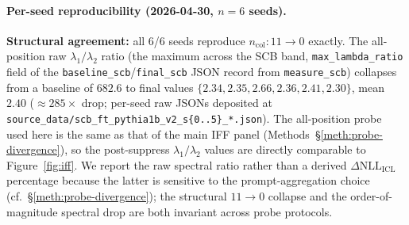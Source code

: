 \documentclass[11pt,a4paper]{article}
\begin{document}
\paragraph{Per-seed reproducibility (2026-04-30, $n=6$ seeds).}
\textbf{Structural agreement:} all 6/6 seeds reproduce
$n_\mathrm{col} : 11 \to 0$ exactly. The all-position raw
$\lambda_1/\lambda_2$ ratio (the maximum across the SCB band,
\texttt{max\_lambda\_ratio} field of the
\texttt{baseline\_scb}/\texttt{final\_scb} JSON record from
\texttt{measure\_scb}) collapses from a baseline of $682.6$ to
final values $\{2.34, 2.35, 2.66, 2.36, 2.41, 2.30\}$, mean $2.40$
($\approx 285\!\times\!$ drop; per-seed raw JSONs deposited at
\texttt{source\_data/scb\_ft\_pythia1b\_v2\_s\{0..5\}\_*.json}).
The all-position probe used here is the same as that of the main
IFF panel (Methods~\S\ref{meth:probe-divergence}), so the
post-suppress $\lambda_1/\lambda_2$ values are directly
comparable to Figure~\ref{fig:iff}. We report the raw spectral
ratio rather than a derived $\Delta\mathrm{NLL}_\mathrm{ICL}$
percentage because the latter is sensitive to the
prompt-aggregation choice (cf.\ \S\ref{meth:probe-divergence});
the structural $11\to 0$ collapse and the order-of-magnitude
spectral drop are both invariant across probe protocols.
\end{document}
